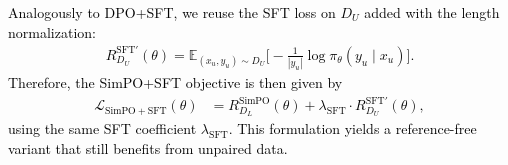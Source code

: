 \documentclass{article} %
\newcommand\rebuttal[1]{\textcolor{black}{#1}}
\begin{document}
\rebuttal{Analogously to DPO+SFT, we reuse the SFT loss on $D_U$ added with the length normalization:
\begin{align}
    R_{D_U}^{\mathrm{SFT'}}(\theta)
    = \mathbb{E}_{(x_u,y_u) \sim D_U}
    \bigg[ - \frac{1}{|y_u|} \log \pi_\theta(y_u \mid x_u) \bigg]. \nonumber
\end{align}
Therefore, the SimPO+SFT objective is then given by
\begin{align}
    \mathcal{L}_{\mathrm{SimPO+SFT}}(\theta)
    &= R_{D_L}^{\mathrm{SimPO}}(\theta)
    + \lambda_{\mathrm{SFT}} \cdot R_{D_U}^{\mathrm{SFT'}}(\theta), \nonumber
\end{align}
using the same SFT coefficient $\lambda_{\mathrm{SFT}}$. This formulation yields a reference-free variant that still benefits from unpaired data.}
\end{document}
